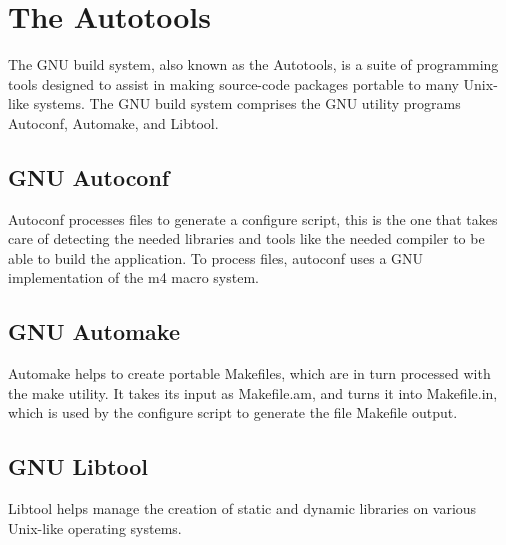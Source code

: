 
\section[The Autotools]{The Autotools\cite{website:autotools}}\label{sec:autotools}

The GNU build system, also known as the Autotools, is a suite of programming tools designed to assist in making source-code packages portable to many Unix-like systems. The GNU build system comprises the GNU utility programs Autoconf, Automake, and Libtool.

\subsection{GNU Autoconf}\label{sec:Autoconf}

Autoconf processes files to generate a configure script, this is the one that takes care of detecting the needed libraries and tools like the needed compiler to be able to build the application. To process files, autoconf uses a GNU implementation of the m4 macro system.

\subsection{GNU Automake}\label{sec:Automake}

Automake helps to create portable Makefiles, which are in turn processed with the make utility. It takes its input as Makefile.am, and turns it into Makefile.in, which is used by the configure script to generate the file Makefile output.

\subsection{GNU Libtool}\label{sec:Libtool}

Libtool helps manage the creation of static and dynamic libraries on various Unix-like operating systems.
